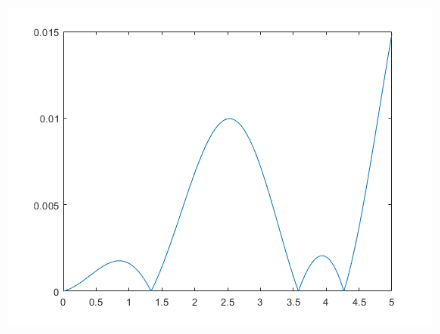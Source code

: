 \documentclass{article}
\begin{document}
\begin{enumerate}
\begin{enumerate}
		\begin{figure}[H]
		\includegraphics[scale=.5]{figure2.png}
		\end{figure}
\end{enumerate}
\end{enumerate}
\end{document}
